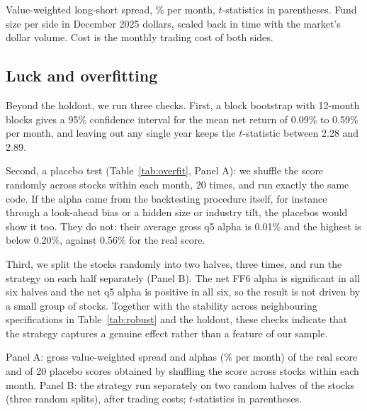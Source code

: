\documentclass[12pt,a4paper]{article}
\newcommand{\tablenote}[1]{\par\vspace{4pt}\begin{minipage}{\linewidth}\footnotesize\singlespacing #1\end{minipage}}
\begin{document}
\begin{table}[H]
\centering
\caption{Trading costs and fund size, 1963--2015}\label{tab:costs}

\tablenote{Value-weighted long-short spread, \% per month, $t$-statistics in parentheses. Fund size
per side in December 2025 dollars, scaled back in time with the market's dollar volume. Cost is the
monthly trading cost of both sides.}
\end{table}

\subsection{Luck and overfitting}\label{sec:overfit}

Beyond the holdout, we run three checks. First, a block bootstrap with 12-month blocks gives a 95\%
confidence interval for the mean net return of 0.09\% to 0.59\% per month, and leaving out any
single year keeps the $t$-statistic between 2.28 and 2.89.

Second, a placebo test (Table~\ref{tab:overfit}, Panel A): we shuffle the score randomly across
stocks within each month, 20 times, and run exactly the same code. If the alpha came from the
backtesting procedure itself, for instance through a look-ahead bias or a hidden size or industry
tilt, the placebos would show it too. They do not: their average gross q5 alpha is 0.01\% and the
highest is below 0.20\%, against 0.56\% for the real score.

Third, we split the stocks randomly into two halves, three times, and run the strategy on each half
separately (Panel B). The net FF6 alpha is significant in all six halves and the net q5 alpha is
positive in all six, so the result is not driven by a small group of stocks. Together with the
stability across neighbouring specifications in Table~\ref{tab:robust} and the holdout, these checks
indicate that the strategy captures a genuine effect rather than a feature of our sample.

\begin{table}[H]
\centering
\caption{Placebo and random-half tests, 1963--2015}\label{tab:overfit}
\resizebox{\textwidth}{!}{}
\tablenote{Panel A: gross value-weighted spread and alphas (\% per month) of the real score and of 20
placebo scores obtained by shuffling the score across stocks within each month. Panel B: the strategy
run separately on two random halves of the stocks (three random splits), after trading costs;
$t$-statistics in parentheses.}
\end{table}
\end{document}
